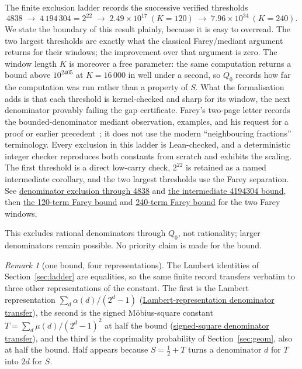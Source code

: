 \documentclass[11pt]{article}
\newcommand{\commit}{bb4e24651b37cd096d3749ef299c3317930b3a3b}
\newcommand{\repobase}{https://github.com/wcook04/plectis-lean-erdos249-257/blob/\commit}
\newcommand{\PK}{Erdos249257}
\newcommand{\lword}[4]{\href{\repobase/\PK/#1\#L#2}{#4}}
\theoremstyle{definition}
\theoremstyle{remark}
\newtheorem*{remark}{Remark}
\newcommand{\Qzero}{Q_0}
\begin{document}
The finite exclusion ladder records the successive verified thresholds
\[
4838 \;\to\; 4\,194\,304 = 2^{22} \;\to\; 2.49\times10^{17}\ (K{=}120)
\;\to\; 7.96\times10^{34}\ (K{=}240).
\]
We state the boundary of this result plainly, because it is easy to overread.
The two largest thresholds are exactly what the classical Farey/mediant
argument returns for their windows; the improvement over that argument is
zero.  The window length \(K\) is moreover a free parameter: the same
computation returns a bound above \(10^{2405}\) at \(K=16\,000\) in well under
a second, so \(\Qzero\) records how far the computation was run rather than a
property of \(S\).  What the formalisation adds is that each threshold is
kernel-checked and sharp for its window, the next denominator provably failing
the gap certificate.  Farey's two-page letter records the bounded-denominator
mediant observation, examples, and his request for a proof or earlier
precedent~\cite[pp.~385--386]{farey1816}; it does not use the modern
``neighbouring fractions'' terminology.  Every exclusion in this ladder is
Lean-checked, and a deterministic integer checker reproduces both constants
from scratch and exhibits the scaling.  The first threshold is a direct
low-carry check,
$2^{22}$ is retained as a named intermediate corollary, and the two largest
thresholds use the Farey separation. See
\lword{CertificateKernel.lean}{15675}{tsum_totient_div_pow_two_ne_ratCast_of_den_le_4838}{denominator exclusion through 4838}
and \lword{CertificateKernel.lean}{18357}{tsum_totient_div_pow_two_ne_ratCast_of_den_le_4194304}{the intermediate 4194304 bound},
then \lword{GapFareyBound.lean}{88}{gap_check_window_1_120_le_248672326362367909}{the 120-term Farey bound} and
\lword{GapFareyBound.lean}{176}{gap_check_window_1_240_le_79639646646701375323355774875831053}{240-term Farey bound}
for the two Farey windows.

This excludes rational denominators through $\Qzero$, not rationality;
larger denominators remain possible.  No priority claim is made for the bound.

\begin{remark}[one bound, four representations]
The Lambert identities of Section~\ref{sec:ladder} are equalities, so the same
finite record transfers verbatim to three other representations of the constant.
The first is the Lambert representation $\sum_d \alpha(d)/(2^d-1)$
(\lword{CertificateKernel.lean}{18473}{tsum_primWeight_div_two_pow_sub_one_ne_int_div_of_den_le_79639646646701375323355774875831053}{Lambert-representation denominator transfer}),
the second is the signed M\"obius-square constant $T=\sum_d\mu(d)/(2^d-1)^2$ at half the bound
(\lword{CertificateKernel.lean}{18487}{tsum_moebius_div_two_pow_sub_one_sq_ne_int_div_of_den_le_39819823323350687661677887437915526}{signed-square denominator transfer}),
and the third is the coprimality probability of Section~\ref{sec:geom}, also at half the bound.
Half appears because $S=\tfrac12+T$ turns a denominator $d$ for $T$ into $2d$ for $S$.
\end{remark}
\end{document}
